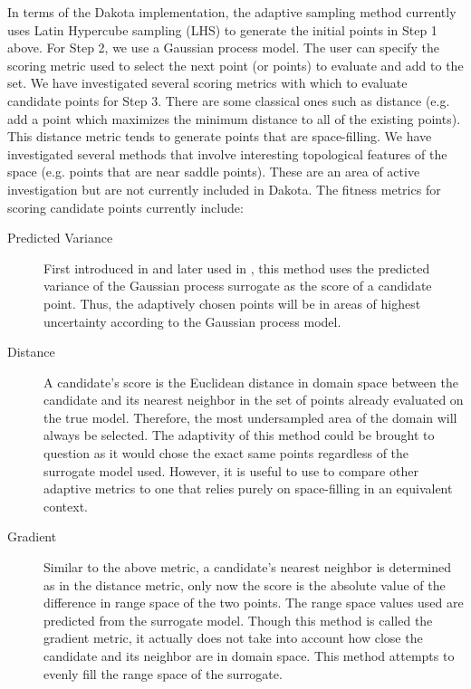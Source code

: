 In terms of the Dakota implementation, the adaptive sampling method 
currently uses Latin Hypercube sampling (LHS) to generate the initial 
points in Step 1 above. For Step 2, we use a Gaussian process model. 
The user can specify the scoring metric used to select the 
next point (or points) to evaluate and add to the set. 
We have investigated several scoring metrics with which to evaluate 
candidate points for Step 3. There are some classical ones such as distance 
(e.g. add a point which maximizes the minimum distance to all of 
the existing points). This distance metric tends to generate 
points that are space-filling. We have investigated several 
methods that involve interesting topological features of the 
space (e.g. points that are near saddle points). These are 
an area of active investigation but are not currently included 
in Dakota. The fitness metrics for scoring 
candidate points currently include: 
\begin{description}
\item[Predicted Variance]
First introduced in \cite{MacKay} and later
used in \cite{Seo}, this method uses the predicted
variance of the Gaussian process surrogate as the score of a candidate 
point. Thus, the adaptively chosen points will be in areas of highest 
uncertainty according to the Gaussian process model.
\item[Distance]
A candidate's score is the Euclidean distance in domain space between the
candidate and its nearest neighbor in the set of points already evaluated on the
true model. Therefore, the most undersampled area of the domain will always be
selected. The adaptivity of this method could be brought to question as it would
chose the exact same points regardless of the surrogate model used. However, it
is useful to use to compare other adaptive metrics to one that relies purely on
space-filling in an equivalent context.
\item[Gradient]
Similar to the above metric, a candidate's nearest neighbor is determined as in
the distance metric, only now the score is the absolute value of the difference
in range space of the two points. The range space values used are predicted
from the surrogate model. Though this method is called the gradient metric, it
actually does not take into account how close the candidate and its neighbor are
in domain space. This method attempts to evenly fill the range space of the
surrogate.
\end{description}

